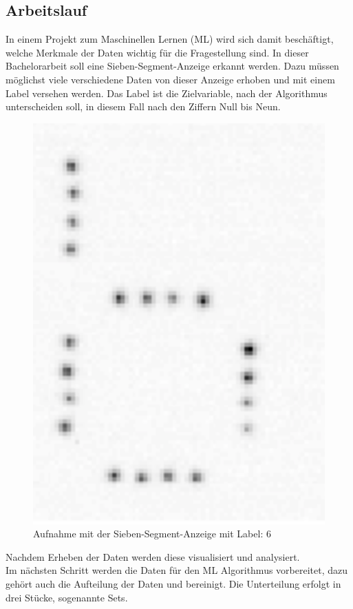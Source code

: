 \subsection{Arbeitslauf}
In einem Projekt zum Maschinellen Lernen (ML)  wird sich damit beschäftigt, welche Merkmale der Daten wichtig für die Fragestellung sind.  In dieser Bachelorarbeit soll eine Sieben-Segment-Anzeige erkannt werden. Dazu müssen möglichst viele verschiedene Daten von dieser Anzeige erhoben  und mit einem Label versehen werden.  Das Label ist die Zielvariable,   nach der Algorithmus unterscheiden soll,  in diesem Fall nach den Ziffern Null bis Neun. 
\begin{figure}[h]
\centering
\includegraphics[scale=0.5]{pic/sechs}
\caption[Sechs]{Aufnahme mit der Sieben-Segment-Anzeige mit Label: 6}
\end{figure}
Nachdem Erheben der Daten werden diese visualisiert und analysiert. \\
Im nächsten Schritt werden die Daten für den ML Algorithmus vorbereitet, dazu gehört auch die Aufteilung der Daten und bereinigt.  Die Unterteilung erfolgt in drei Stücke, sogenannte Sets.
